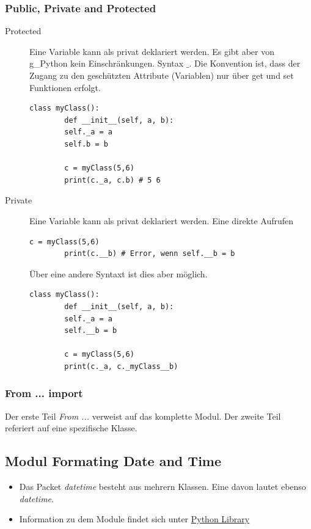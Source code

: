 \subsubsection{Public, Private and Protected}
\begin{description}
	\item[Protected] Eine Variable kann als privat deklariert werden. Es gibt aber von \gls{g_Python} kein Einschränkungen. Syntax $\_$. Die Konvention ist, dass der Zugang zu den geschützten Attribute (Variablen) nur über get und set Funktionen erfolgt.
	\begin{lstlisting}[style=python]
		class myClass():
		def __init__(self, a, b):
		self._a = a
		self.b = b
		
		c = myClass(5,6)
		print(c._a, c.b) # 5 6
	\end{lstlisting}
	\item[Private] Eine Variable kann als privat deklariert werden. Eine direkte Aufrufen
	\begin{lstlisting}[style=python]
		c = myClass(5,6)
		print(c.__b) # Error, wenn self.__b = b
	\end{lstlisting} Über eine andere Syntaxt ist dies aber möglich.
	\begin{lstlisting}[style=python]
		class myClass():
		def __init__(self, a, b):
		self._a = a
		self.__b = b
		
		c = myClass(5,6)
		print(c._a, c._myClass__b)
	\end{lstlisting}
\end{description}

\subsubsection{From ... import}
Der erste Teil \textit{From ...} verweist auf das komplette Modul. Der zweite Teil referiert auf eine spezifische Klasse.

\subsection{Modul Formating Date and Time}
\begin{itemize}
	\item Das Packet \textit{datetime} besteht aus mehrern Klassen. Eine davon lautet ebenso \textit{datetime}. 
	\item Information zu dem Module findet sich unter \href{https://docs.python.org/3/library/datetime.html}{Python Library}
\end{itemize}

